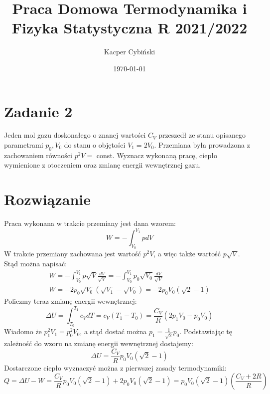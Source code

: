 \documentclass[12pt,a4paper]{article}
\title{Praca Domowa Termodynamika i Fizyka Statystyczna R 2021/2022}
\author{Kacper Cybiński}
\date{\today}
\begin{document}
\maketitle

\section{Zadanie 2}

Jeden mol gazu doskonałego o znanej wartości $C_{V}$ przeszedł ze stanu opisanego parametrami $p_{0}, V_{0}$ do stanu o objętości $V_{1}=2 V_{0}$. Przemiana była prowadzona z zachowaniem równości $p^{2} V=$ const. Wyznacz wykonaną pracę, ciepło wymienione z otoczeniem oraz zmianę energii wewnętrznej gazu.

\section{Rozwiązanie}

Praca wykonana w trakcie przemiany jest dana wzorem:
$$
W=-\int_{V_{0}}^{V_{1}} p d V
$$
W trakcie przemiany zachowana jest wartość $p^{2} V$, a więc także wartość $p \sqrt{V}$. Stąd można napisać:
$$
\begin{gathered}
W=-\int_{V_{0}}^{V_{1}} p \sqrt{V} \frac{d V}{\sqrt{V}}=-\int_{V_{0}}^{V_{1}} p_{0} \sqrt{V_{0}} \frac{d V}{\sqrt{V}} \\
W=-2 p_{0} \sqrt{V_{0}}\left(\sqrt{V_{1}}-\sqrt{V_{0}}\right)=-2 p_{0} V_{0}(\sqrt{2}-1)
\end{gathered}
$$
Policzmy teraz zmianę energii wewnętrznej:
$$
\Delta U=\int_{T_{0}}^{T_{1}} c_{V} d T=c_{V}\left(T_{1}-T_{0}\right)=\frac{C_{V}}{R}\left(2 p_{1} V_{0}-p_{0} V_{0}\right)
$$
Wiadomo że $p_{1}^{2} V_{1}=p_{0}^{2} V_{0}$, a stąd dostać można $p_{1}=\frac{1}{\sqrt{2}} p_{0}$. Podstawiając tę zależność do wzoru na zmianę energii wewnętrznej dostajemy:
$$
\Delta U=\frac{C_{V}}{R} p_{0} V_{0}(\sqrt{2}-1)
$$
Dostarczone ciepło wyznaczyć można z pierwszej zasady termodynamiki:
$$
Q=\Delta U-W=\frac{C_{V}}{R} p_{0} V_{0}(\sqrt{2}-1)+2 p_{0} V_{0}(\sqrt{2}-1)=p_{0} V_{0}(\sqrt{2}-1)\left(\frac{C_{V}+2 R}{R}\right)
$$
\end{document}

